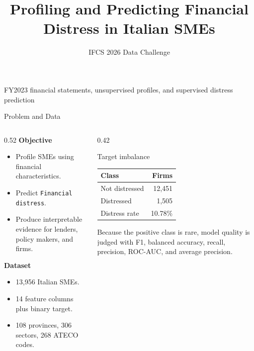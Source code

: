 \documentclass[aspectratio=169,10pt]{beamer}
\title[IFCS Financial Distress]{Profiling and Predicting Financial Distress in Italian SMEs}
\subtitle{IFCS 2026 Data Challenge}
\author{}
\date{}
\newcommand{\pct}[1]{#1\%}
\begin{document}
\begin{frame}
  \titlepage
  \vspace{-0.7cm}
  \begin{center}
    \small FY2023 financial statements, unsupervised profiles, and supervised distress prediction
  \end{center}
\end{frame}

\begin{frame}{Problem and Data}
  \begin{columns}[T,totalwidth=\textwidth]
    \begin{column}{0.52\textwidth}
      \textbf{Objective}
      \begin{itemize}
        \item Profile SMEs using financial characteristics.
        \item Predict \texttt{Financial distress}.
        \item Produce interpretable evidence for lenders, policy makers, and firms.
      \end{itemize}

      \vspace{0.25cm}
      \textbf{Dataset}
      \begin{itemize}
        \item 13,956 Italian SMEs.
        \item 14 feature columns plus binary target.
        \item 108 provinces, 306 sectors, 268 ATECO codes.
      \end{itemize}
    \end{column}

    \begin{column}{0.42\textwidth}
      \begin{block}{Target imbalance}
        \centering
        \begin{tabular}{lr}
          \toprule
          Class & Firms \\
          \midrule
          Not distressed & 12,451 \\
          Distressed & 1,505 \\
          \midrule
          Distress rate & \pct{10.78} \\
          \bottomrule
        \end{tabular}
      \end{block}

      \vspace{0.15cm}
      \small
      Because the positive class is rare, model quality is judged with F1,
      balanced accuracy, recall, precision, ROC-AUC, and average precision.
    \end{column}
  \end{columns}
\end{frame}
\end{document}
